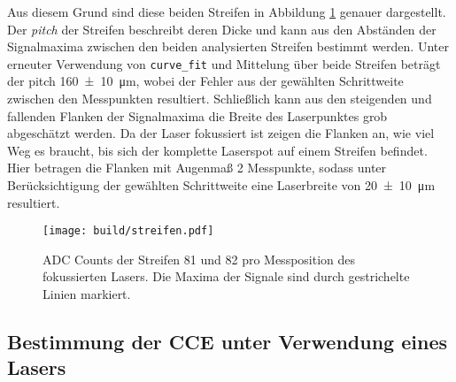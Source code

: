 Aus diesem Grund sind diese beiden Streifen in Abbildung \ref{fig:streifen}
genauer dargestellt. Der \emph{pitch} der Streifen beschreibt deren Dicke
und kann aus den Abständen der Signalmaxima zwischen den beiden analysierten
Streifen bestimmt werden.
Unter erneuter Verwendung von \texttt{curve\_fit} und Mittelung über beide Streifen
beträgt der pitch \SI{160(10)}{\micro\meter}, wobei der Fehler aus der gewählten
Schrittweite zwischen den Messpunkten resultiert.
Schließlich kann aus den steigenden und fallenden Flanken der Signalmaxima die
Breite des Laserpunktes grob abgeschätzt werden.
Da der Laser fokussiert ist zeigen die Flanken an, wie viel Weg es braucht, bis
sich der komplette Laserspot auf einem Streifen befindet.
Hier betragen die Flanken mit Augenmaß 2 Messpunkte, sodass unter Berücksichtigung
der gewählten Schrittweite eine Laserbreite von \SI{20(10)}{\micro\meter} resultiert.
\begin{figure}
  \centering
  \texttt{[image: build/streifen.pdf]}  %
  \caption{ADC Counts der Streifen 81 und 82 pro Messposition des fokussierten
  Lasers. Die Maxima der Signale sind durch gestrichelte Linien markiert.}
  \label{fig:streifen}
\end{figure}

\FloatBarrier
\subsection{Bestimmung der CCE unter Verwendung eines Lasers}
\label{sec:CCEL-Auswertung}

